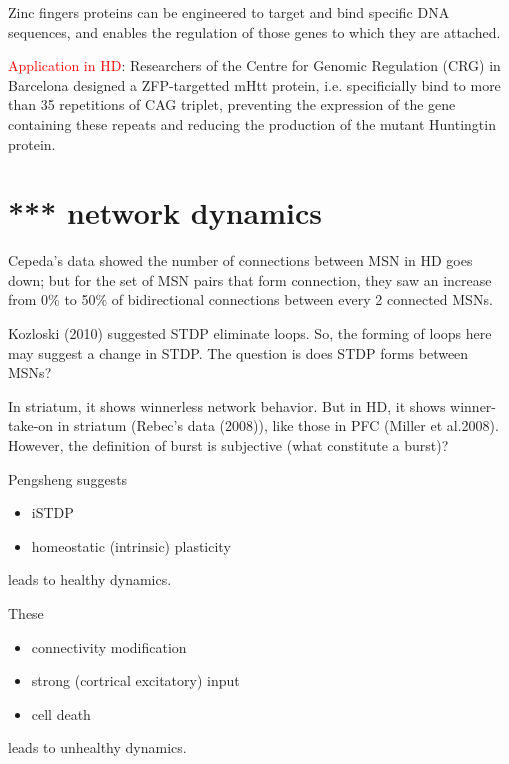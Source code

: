 Zinc fingers proteins can be engineered to target and bind specific DNA
sequences, and enables the regulation of those genes to which they are attached.

\textcolor{red}{Application in HD}: Researchers of the Centre for Genomic
Regulation (CRG) in Barcelona designed a ZFP-targetted mHtt protein, i.e.
specificially bind to more than 35 repetitions of CAG triplet, preventing the
expression of the gene containing these repeats and reducing the production of
the mutant Huntingtin protein.


\section{*** network dynamics}	

Cepeda's data showed the number of connections between MSN in HD goes down; but
for the set of MSN pairs that form connection, they saw an increase from 0\% to
50\% of bidirectional connections between every 2 connected MSNs.

Kozloski (2010) suggested STDP eliminate loops. So, the forming of loops here
may suggest a change in STDP. The question is does STDP forms between MSNs?

In striatum, it shows winnerless network behavior. But in HD, it shows
winner-take-on in striatum (Rebec's data (2008)), like those in PFC (Miller et
al.2008).
However, the definition of burst is subjective (what constitute a burst)?

Pengsheng suggests
\begin{itemize}
  \item iSTDP
  \item homeostatic (intrinsic) plasticity
\end{itemize}
leads to healthy dynamics.

These
\begin{itemize}
  \item connectivity modification
  \item strong (cortrical excitatory) input
  \item cell death
\end{itemize}
leads to unhealthy dynamics.

